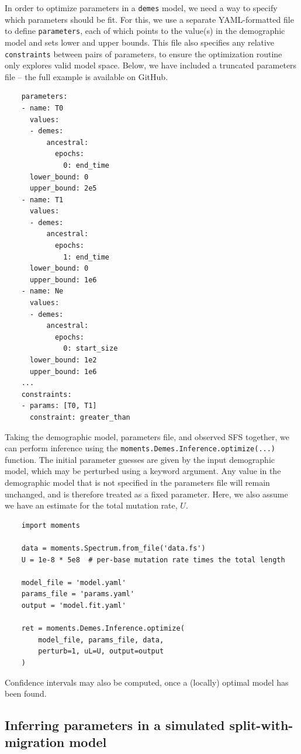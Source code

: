 \documentclass[]{article}
\newcommand{\demes}{\texttt{demes}\xspace}
\begin{document}
In order to optimize parameters in a \demes model, we need a way to specify
which parameters should be fit. For this, we use a separate YAML-formatted file
to define \texttt{parameters}, each of which points to the value(s) in the
demographic model and sets lower and upper bounds. This file also specifies any
relative \texttt{constraints} between pairs of parameters, to ensure the
optimization routine only explores valid model space. Below, we have included
a truncated parameters file -- the full example is available on GitHub.
\begin{verbatim}
    parameters:
    - name: T0
      values:
      - demes:
          ancestral:
            epochs:
              0: end_time
      lower_bound: 0
      upper_bound: 2e5
    - name: T1
      values:
      - demes:
          ancestral:
            epochs:
              1: end_time
      lower_bound: 0
      upper_bound: 1e6
    - name: Ne
      values:
      - demes:
          ancestral:
            epochs:
              0: start_size
      lower_bound: 1e2
      upper_bound: 1e6
    ...
    constraints:
    - params: [T0, T1]
      constraint: greater_than
\end{verbatim}

Taking the demographic model, parameters file, and observed SFS together, we
can perform inference using the \texttt{moments.Demes.Inference.optimize(...)}
function.  The initial parameter guesses are given by the input demographic
model, which may be perturbed using a keyword argument. Any value in the
demographic model that is not specified in the parameters file will remain
unchanged, and is therefore treated as a fixed parameter. Here, we also assume
we have an estimate for the total mutation rate, $U$.
\begin{verbatim}
    import moments 

    data = moments.Spectrum.from_file('data.fs')
    U = 1e-8 * 5e8  # per-base mutation rate times the total length

    model_file = 'model.yaml'
    params_file = 'params.yaml'
    output = 'model.fit.yaml'

    ret = moments.Demes.Inference.optimize(
        model_file, params_file, data,
        perturb=1, uL=U, output=output
    )
\end{verbatim}

Confidence intervals may also be computed, once a (locally) optimal model has
been found.

\subsection*{Inferring parameters in a simulated split-with-migration model}
\end{document}
